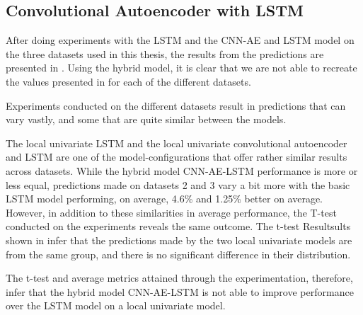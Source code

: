 
\subsection{Convolutional Autoencoder with LSTM}
\label{section:Discussion:Discussion:CNN-AE-LSTM}





After doing experiments with the LSTM and the CNN-AE and LSTM model on the three datasets used in this thesis,
the results from the predictions are presented in .
Using the hybrid model, it is clear that we are not able to recreate the values presented in \cite{Zhao2019}
for each of the different datasets.

Experiments conducted on the different datasets result in predictions that can vary vastly,
and some that are quite similar between the models.

The local univariate LSTM and the local univariate convolutional autoencoder and LSTM are one of the model-configurations
that offer rather similar results across datasets.
While the hybrid model CNN-AE-LSTM performance is more or less equal, predictions made on datasets 2 and 3 vary a bit more
with the basic LSTM model performing, on average, 4.6\% and 1.25\% better on average.
However, in addition to these similarities in average performance, the T-test conducted on the experiments reveals the same outcome.
The t-test Resultsults shown in  infer that the predictions made by the two local univariate models
are from the same group, and there is no significant difference in their distribution.

The t-test and average metrics attained through the experimentation, therefore, infer that the hybrid model CNN-AE-LSTM
is not able to improve performance over the LSTM model on a local univariate model.


